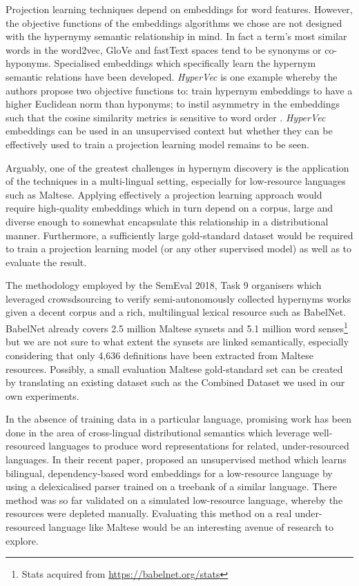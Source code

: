 Projection learning techniques depend on embeddings for word features.  However, the objective functions of the embeddings algorithms we chose are not designed with the hypernymy semantic relationship in mind.  In fact a term's most similar words in the word2vec, GloVe and fastText spaces tend to be synonyms or co-hyponyms.  Specialised embeddings which specifically learn the hypernym semantic relations have been developed.  \textit{HyperVec} is one example whereby the authors propose two objective functions to: train hypernym embeddings to have a higher Euclidean norm than hyponyms; to instil asymmetry in the embeddings such that the cosine similarity metrics is sensitive to word order \citep{nguyen2017hierarchical}.  \textit{HyperVec} embeddings can be used in an unsupervised context but whether they can be effectively used to train a projection learning model remains to be seen.

Arguably, one of the greatest challenges in hypernym discovery is the application of the techniques in a multi-lingual setting, especially for low-resource languages such as Maltese.  Applying effectively a projection learning approach would require high-quality embeddings which in turn depend on a corpus, large and diverse enough to somewhat encapsulate this relationship in a distributional manner.  Furthermore, a sufficiently large gold-standard dataset would be required to train a projection learning model (or any other supervised model) as well as to evaluate the result.

The methodology employed by the SemEval 2018, Task 9 organisers which leveraged crowsdsourcing to verify semi-autonomously collected hypernyms works given a decent corpus and a rich, multilingual lexical resource such as BabelNet.  BabelNet already covers 2.5 million Maltese synsets and 5.1 million word senses\footnote{Stats acquired from \url{https://babelnet.org/stats}} but we are not sure to what extent the synsets are linked semantically, especially considering that only 4,636 definitions have been extracted from Maltese resources.  Possibly, a small evaluation Maltese gold-standard set can be created by translating an existing dataset such as the Combined Dataset we used in our own experiments.

In the absence of training data in a particular language, promising work has been done in the area of cross-lingual distributional semantics which leverage well-resourced languages to produce word representations for related, under-resourced languages.  In their recent paper, \citet{upadhyay2018robust} proposed an unsupervised method which learns bilingual, dependency-based word embeddings for a low-resource language by using a delexicalised parser trained on a treebank of a similar language.  There method was so far validated on a simulated low-resource language, whereby the resources were depleted manually.  Evaluating this method on a real under-resourced language like Maltese would be an interesting avenue of research to explore. 